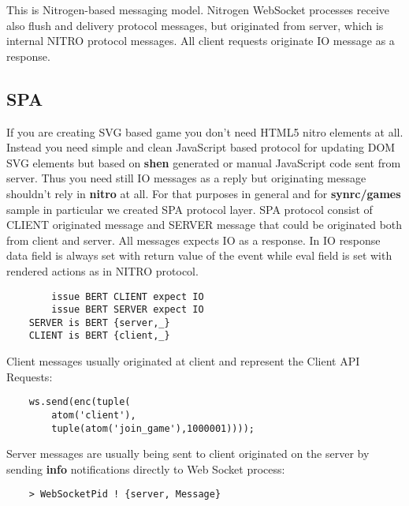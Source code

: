 This is Nitrogen-based messaging model. Nitrogen WebSocket processes receive also
flush and delivery protocol messages, but originated from server, which is internal
NITRO protocol messages. All client requests originate IO message as a response.

\newpage
\subsection{SPA}

If you are creating SVG based game you don't need HTML5 nitro elements at all.
Instead you need simple and clean JavaScript based protocol for updating DOM SVG elements
but based on {\bf shen} generated or manual JavaScript code sent from server.
Thus you need still IO messages as a reply but originating message shouldn't
rely in {\bf nitro} at all. For that purposes in general and for {\bf synrc/games} sample
in particular we created SPA protocol layer. SPA protocol consist of CLIENT originated message
and SERVER message that could be originated both from client and server. All messages expects
IO as a response. In IO response data field is always set with return value of the event
while eval field is set with rendered actions as in NITRO protocol.

\vspace{1\baselineskip}
\begin{lstlisting}
        issue BERT CLIENT expect IO
        issue BERT SERVER expect IO
    SERVER is BERT {server,_}
    CLIENT is BERT {client,_}
\end{lstlisting}
\vspace{1\baselineskip}

Client messages usually originated at client and represent the Client API Requests:

\vspace{1\baselineskip}
\begin{lstlisting}
    ws.send(enc(tuple(
        atom('client'),
        tuple(atom('join_game'),1000001))));
\end{lstlisting}
\vspace{1\baselineskip}

Server messages are usually being sent to client originated on the
server by sending {\bf info} notifications directly to Web Socket process:

\begin{lstlisting}
    > WebSocketPid ! {server, Message}
\end{lstlisting}

